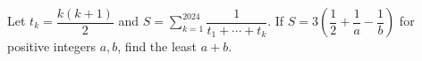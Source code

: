 Let $t_k=\dfrac{k(k+1)}{2}$ and $S=\sum_{k=1}^{2024}\dfrac{1}{t_1+\cdots+t_k}$. If $S=3(\dfrac{1}{2}+\dfrac{1}{a}-\dfrac{1}{b})$ for positive integers $a,b$, find the least $a+b$.
